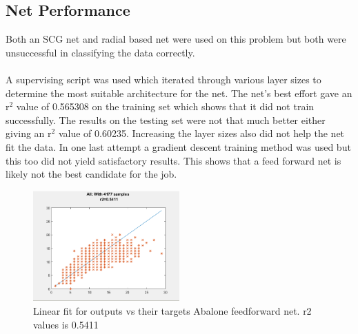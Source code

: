 \documentclass[10pt]{article}
\begin{document}
\subsection{Net Performance}
Both an SCG net and radial based net were used on this problem but both were unsuccessful in classifying the data correctly.
\\
\\
A supervising script was used which iterated through various layer sizes to determine the most suitable architecture for the net. The net's best effort gave an r$^{2}$ value of 0.565308 on the training set which shows that it did not train successfully. The results on the testing set were not that much better either giving an r$^{2}$ value of 0.60235. Increasing the layer sizes also did not help the net fit the data. In one last attempt a gradient descent training method was used but this too did not yield satisfactory results. This shows that a feed forward net is likely not the best candidate for the job.

\begin{center}
\begin{figure}[h]
\centering
\includegraphics[width=0.50\textwidth]{aba_ar}
\caption{Linear fit for outputs vs their targets Abalone feedforward net. r2 values is 0.5411}
\end{figure}
\end{center}
\end{document}
